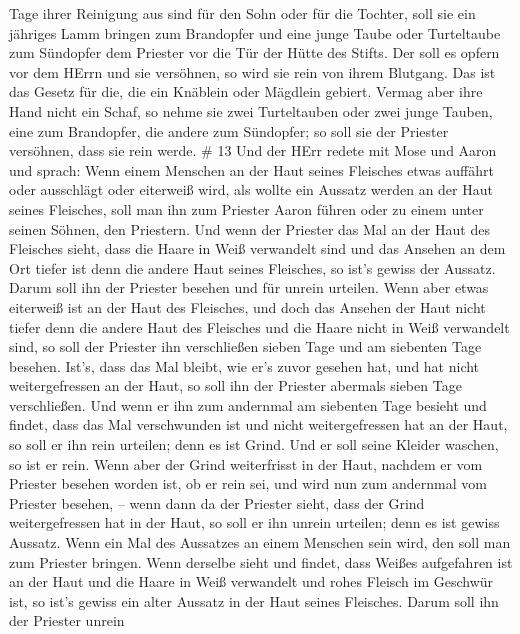 Tage ihrer Reinigung aus sind für den Sohn oder für die Tochter, soll
sie ein jähriges Lamm bringen zum Brandopfer und eine junge Taube oder
Turteltaube zum Sündopfer dem Priester vor die Tür der Hütte des Stifts.
 Der soll es opfern vor dem HErrn und sie versöhnen, so wird
sie rein von ihrem Blutgang. Das ist das Gesetz für die, die ein
Knäblein oder Mägdlein gebiert.  Vermag aber ihre Hand nicht
ein Schaf, so nehme sie zwei Turteltauben oder zwei junge Tauben, eine
zum Brandopfer, die andere zum Sündopfer; so soll sie der Priester
versöhnen, dass sie rein werde. \# 13  Und der HErr redete
mit Mose und Aaron und sprach:  Wenn einem Menschen an der
Haut seines Fleisches etwas auffährt oder ausschlägt oder eiterweiß
wird, als wollte ein Aussatz werden an der Haut seines Fleisches, soll
man ihn zum Priester Aaron führen oder zu einem unter seinen Söhnen, den
Priestern.  Und wenn der Priester das Mal an der Haut des
Fleisches sieht, dass die Haare in Weiß verwandelt sind und das Ansehen
an dem Ort tiefer ist denn die andere Haut seines Fleisches, so ist's
gewiss der Aussatz. Darum soll ihn der Priester besehen und für unrein
urteilen.  Wenn aber etwas eiterweiß ist an der Haut des
Fleisches, und doch das Ansehen der Haut nicht tiefer denn die andere
Haut des Fleisches und die Haare nicht in Weiß verwandelt sind, so soll
der Priester ihn verschließen sieben Tage  und am siebenten
Tage besehen. Ist's, dass das Mal bleibt, wie er's zuvor gesehen hat,
und hat nicht weitergefressen an der Haut,  so soll ihn der
Priester abermals sieben Tage verschließen. Und wenn er ihn zum
andernmal am siebenten Tage besieht und findet, dass das Mal
verschwunden ist und nicht weitergefressen hat an der Haut, so soll er
ihn rein urteilen; denn es ist Grind. Und er soll seine Kleider waschen,
so ist er rein.  Wenn aber der Grind weiterfrisst in der
Haut, nachdem er vom Priester besehen worden ist, ob er rein sei, und
wird nun zum andernmal vom Priester besehen, --  wenn dann
da der Priester sieht, dass der Grind weitergefressen hat in der Haut,
so soll er ihn unrein urteilen; denn es ist gewiss Aussatz. 
Wenn ein Mal des Aussatzes an einem Menschen sein wird, den soll man zum
Priester bringen.  Wenn derselbe sieht und findet, dass
Weißes aufgefahren ist an der Haut und die Haare in Weiß verwandelt und
rohes Fleisch im Geschwür ist,  so ist's gewiss ein alter
Aussatz in der Haut seines Fleisches. Darum soll ihn der Priester unrein
